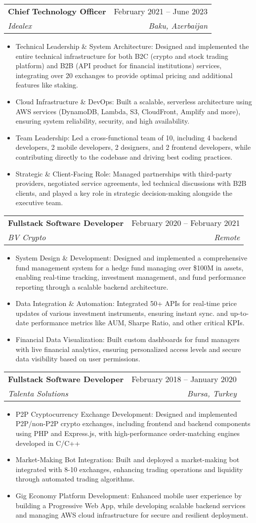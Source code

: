 \documentclass[letterpaper,11pt]{article}
\makeatletter
\newcommand{\resumeItem}[1]{
  \item\small{
    {#1 \vspace{-2pt}}
  }
}
\newcommand{\resumeSubheading}[4]{
  \vspace{-2pt}\item
    \begin{tabular*}{0.97\textwidth}[t]{l@{\extracolsep{\fill}}r}
      \textbf{#1} & #2 \\
      \textit{\small#3} & \textit{\small #4} \\
    \end{tabular*}\vspace{-7pt}
}
\newcommand{\resumeItemListStart}{\begin{itemize}}
\newcommand{\resumeItemListEnd}{\end{itemize}\vspace{-5pt}}
\makeatother
\begin{document}
  \resumeSubheading
  {Chief Technology Officer}{February 2021 -- June 2023}
  {Idealex}{Baku, Azerbaijan}
  \resumeItemListStart
    \resumeItem{Technical Leadership \& System Architecture: Designed and implemented the entire technical infrastructure for both B2C (crypto and stock trading platform) and B2B (API product for financial institutions) services, integrating over 20 exchanges to provide optimal pricing and additional features like staking.}
    \resumeItem{Cloud Infrastructure \& DevOps: Built a scalable, serverless architecture using AWS services (DynamoDB, Lambda, S3, CloudFront, Amplify and more), ensuring system reliability, security, and high availability.}
    \resumeItem{Team Leadership: Led a cross-functional team of 10, including 4 backend developers, 2 mobile developers, 2 designers, and 2 frontend developers, while contributing directly to the codebase and driving best coding practices.}
    \resumeItem{ Strategic \& Client-Facing Role: Managed partnerships with third-party providers, negotiated service agreements, led technical discussions with B2B clients, and played a key role in strategic decision-making alongside the executive team.}
  \resumeItemListEnd

  \resumeSubheading
  {Fullstack Software Developer}{February 2020 -- February 2021}
  {BV Crypto}{Remote}
  \resumeItemListStart
    \resumeItem{System Design \& Development: Designed and implemented a comprehensive fund management system for a hedge fund managing over \$100M in assets, enabling real-time tracking, investment management, and fund performance reporting through a scalable backend architecture.}
    \resumeItem{Data Integration \& Automation: Integrated 50+ APIs for real-time price updates of various investment instruments, ensuring instant sync. and up-to-date performance metrics like AUM, Sharpe Ratio, and other critical KPIs.}
    \resumeItem{Financial Data Visualization: Built custom dashboards for fund managers with live financial analytics, ensuring personalized access levels and secure data visibility based on user permissions.}
  \resumeItemListEnd

  \resumeSubheading
  {Fullstack Software Developer}{February 2018 -- January 2020}
  {Talenta Solutions}{Bursa, Turkey}
  \resumeItemListStart
    \resumeItem{P2P Cryptocurrency Exchange Development: Designed and implemented P2P/non-P2P crypto exchanges, including frontend and backend components using PHP and Express.js, with high-performance order-matching engines developed in C/C++}
    \resumeItem{Market-Making Bot Integration: Built and deployed a market-making bot integrated with 8-10 exchanges, enhancing trading operations and liquidity through automated trading algorithms.}
    \resumeItem{Gig Economy Platform Development: Enhanced mobile user experience by building a Progressive Web App, while developing scalable backend services and managing AWS cloud infrastructure for secure and resilient deployment.}
  \resumeItemListEnd
\end{document}
